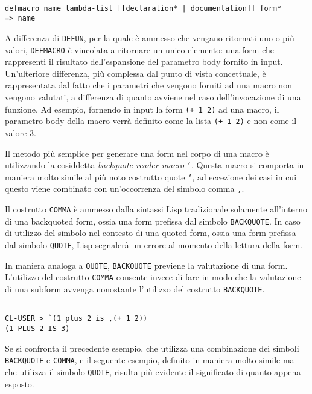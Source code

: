 \begin{lstlisting}[caption=Signature della macro DEFMACRO]

defmacro name lambda-list [[declaration* | documentation]] form*
=> name

\end{lstlisting}

A differenza di \texttt{DEFUN}, per la quale è ammesso che vengano ritornati uno
o più valori, \texttt{DEFMACRO} è vincolata a ritornare un unico elemento: una
form che rappresenti il risultato dell'espansione del parametro body fornito in
input. Un’ulteriore differenza, più complessa dal punto di vista concettuale, è
rappresentata dal fatto che i parametri che vengono forniti ad una macro non
vengono valutati, a differenza di quanto avviene nel caso dell’invocazione di
una funzione. Ad esempio, fornendo in input la form \texttt{(+ 1 2)} ad una
macro, il parametro body della macro verrà definito come la lista \texttt{(+ 1
2)} e non come il valore $3$.

Il metodo più semplice per generare una form nel corpo di una macro è
utilizzando la cosiddetta \textit{backquote reader macro} \texttt{`}. Questa
macro si comporta in maniera molto simile al più noto costrutto quote
\texttt{‘}, ad eccezione dei casi in cui questo viene combinato con
un’occorrenza del simbolo comma \texttt{,}.

Il costrutto \texttt{COMMA} è ammesso dalla sintassi Lisp tradizionale solamente
all’interno di una backquoted form, ossia una form prefissa dal simbolo
\texttt{BACKQUOTE}. In caso di utilizzo del simbolo nel contesto di una quoted
form, ossia una form prefissa dal simbolo \texttt{QUOTE}, Lisp segnalerà un
errore al momento della lettura della form.

In maniera analoga a \texttt{QUOTE}, \texttt{BACKQUOTE} previene la valutazione
di una form. L’utilizzo del costrutto \texttt{COMMA} consente invece di fare in
modo che la valutazione di una subform avvenga nonostante l’utilizzo del
costrutto \texttt{BACKQUOTE}.

\begin{lstlisting}

CL-USER > `(1 plus 2 is ,(+ 1 2))
(1 PLUS 2 IS 3)

\end{lstlisting}

Se si confronta il precedente esempio, che utilizza una combinazione dei simboli
\texttt{BACKQUOTE} e \texttt{COMMA}, e il seguente esempio, definito in maniera
molto simile ma che utilizza il simbolo \texttt{QUOTE}, risulta più evidente il
significato di quanto appena esposto.

